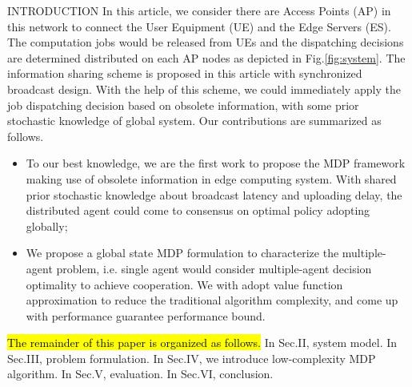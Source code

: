\documentclass[10pt, conference, letterpaper]{IEEEtran}
\begin{document}
\begin{section}{INTRODUCTION}
        In this article, we consider there are Access Points (AP) in this network to connect the User Equipment (UE) and the Edge Servers (ES).
        The computation jobs would be released from UEs and the dispatching decisions are determined distributed on each AP nodes as depicted in Fig.\ref{fig:system}.
        The information sharing scheme is proposed in this article with synchronized broadcast design. With the help of this scheme, we could immediately apply the job dispatching decision based on obsolete information, with some prior stochastic knowledge of global system.
        Our contributions are summarized as follows.
        \begin{itemize}
            \item To our best knowledge, we are the first work to propose the MDP framework making use of obsolete information in edge computing system. With shared prior stochastic knowledge about broadcast latency and uploading delay, the distributed agent could come to consensus on optimal policy adopting globally;
            \item We propose a global state MDP formulation to characterize the multiple-agent problem, i.e. single agent would consider multiple-agent decision optimality to achieve cooperation.
            We with adopt value function approximation to reduce the traditional algorithm complexity, and come up with performance guarantee performance bound.
        \end{itemize}

        \hl{The remainder of this paper is organized as follows.}
        In Sec.II, system model.
        In Sec.III, problem formulation.
        In Sec.IV, we introduce low-complexity MDP algorithm.
        In Sec.V, evaluation.
        In Sec.VI, conclusion.
    \end{section}
\end{document}
